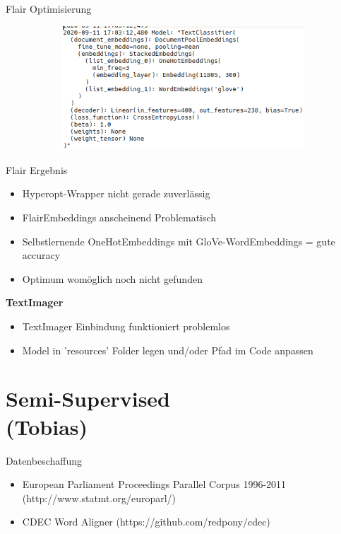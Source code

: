 \documentclass[xcolor=table]{beamer}
\begin{document}
\begin{frame}[t]{Flair Optimisierung}
\begin{figure}
\begin{subfigure}{.3\textwidth}
	\end{subfigure}%
	\begin{subfigure}{.3\textwidth}
		\includegraphics[scale=.3]{flair_best_try.png}
	\end{subfigure}%
\end{figure}
\end{frame}

\begin{frame}[t]{Flair Ergebnis}\vspace{10pt}
\begin{itemize}
\item Hyperopt-Wrapper nicht gerade zuverlässig
\item FlairEmbeddings anscheinend Problematisch
\item Selbstlernende OneHotEmbeddings mit GloVe-WordEmbeddings = gute accuracy
\item Optimum womöglich noch nicht gefunden
\end{itemize}
\textbf{TextImager}
\begin{itemize}
\item TextImager Einbindung funktioniert problemlos
\item Model in 'resources' Folder legen und/oder Pfad im Code anpassen
\end{itemize}
\end{frame}


\section{Semi-Supervised\\(Tobias)}
\begin{frame}[t]{Datenbeschaffung}\vspace{10pt}
\begin{itemize}
\item European Parliament Proceedings Parallel Corpus 1996-2011 (http://www.statmt.org/europarl/)
\item CDEC Word Aligner (https://github.com/redpony/cdec)
\end{itemize}
\end{frame}
\end{document}
